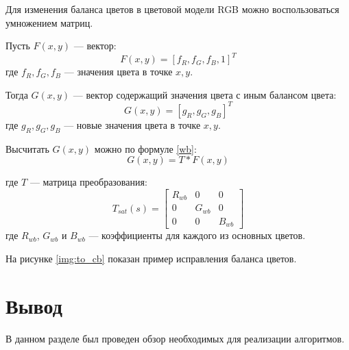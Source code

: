 Для изменения баланса цветов в цветовой модели RGB можно воспользоваться умножением матриц.

Пусть $F(x,y)$ --- вектор:
\begin{equation}
	\label{F}
	F(x,y) = [f_R, f_G, f_B, 1]^T
\end{equation}
где $f_R, f_G, f_B$ --- значения цвета в точке $x,y$.

Тогда $G(x,y)$ --- вектор содержащий значения цвета с иным балансом цвета:
\begin{equation}
	\label{G}
	G(x,y) = [g_R, g_G, g_B]^T
\end{equation}
где $g_R, g_G, g_B$ --- новые значения цвета в точке $x,y$.

Высчитать $G(x,y)$ можно по формуле \ref{wb}:
\begin{equation}
	\label{wb}
	G(x,y) = T * F(x,y)
\end{equation}

где $T$ --- матрица преобразования:
\begin{equation}
	\label{twb}
	T_{sat}(s) = \begin{bmatrix}
		R_{wb} & 0 & 0 \\
		0 & G_{wb} & 0 \\ 
		0 & 0 & B_{wb} 
	\end{bmatrix}
\end{equation}
где $R_{wb}$, $G_{wb}$ и $B_{wb}$ --- коэффициенты для каждого из основных цветов.

На рисунке \ref{img:to_cb} показан пример исправления баланса цветов.


\section*{Вывод}

\begin{table}[h]
	\begin{center}
		\caption{Используемая информация о изображении.}
		\label{tbl:info}
	\end{center}
\end{table}

В данном разделе был проведен обзор необходимых для реализации алгоритмов.